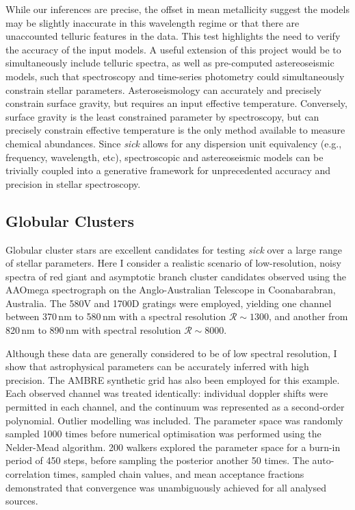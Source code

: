 \documentclass{aastex}
\newcommand{\sick}{\textit{sick}}
\begin{document}
While our inferences are precise, the offset in mean metallicity suggest the 
models may be slightly inaccurate in this wavelength regime or that there are 
unaccounted telluric features in the data. This test highlights the need to 
verify the accuracy of the input models. A useful extension of this project 
would be to simultaneously include telluric spectra, as well as pre-computed 
astereoseismic models, such that spectroscopy and time-series photometry could 
simultaneously constrain stellar parameters. Asteroseismology can accurately and 
precisely constrain surface gravity, but requires an input effective temperature. 
Conversely, surface gravity is the least constrained parameter by spectroscopy, 
but can precisely constrain effective temperature is the only method available 
to measure chemical abundances. Since \sick{} allows for any dispersion unit 
equivalency (e.g., frequency, wavelength, etc), spectroscopic and astereoseismic 
models can be trivially coupled into a generative framework for unprecedented 
accuracy and precision in stellar spectroscopy.

\subsection{Globular Clusters}
Globular cluster stars are excellent candidates for testing \sick{} over a large 
range of stellar parameters. Here I consider a realistic scenario of 
low-resolution, noisy spectra of red giant and asymptotic branch cluster 
candidates observed using the AAOmega spectrograph on the Anglo-Australian 
Telescope in Coonabarabran, Australia. The 580V and 1700D gratings were employed, 
yielding one channel between 370\,nm to 580\,nm with a spectral resolution 
$\mathcal{R} \sim 1300$, and another from 820\,nm to 890\,nm with spectral 
resolution $\mathcal{R} \sim 8000$.

Although these data are generally considered to be of low spectral resolution, 
I show that astrophysical parameters can be accurately inferred with high 
precision. The AMBRE synthetic grid has also been employed for this example. 
Each observed channel was treated identically: individual doppler shifts were 
permitted in each channel, and the continuum was represented as a second-order 
polynomial. Outlier modelling was included.
The parameter space was randomly sampled 1000 times before numerical optimisation 
was performed using the Nelder-Mead algorithm. 200 walkers explored the parameter 
space for a burn-in period of 450 steps, before sampling the posterior another 
50 times. The auto-correlation times, sampled chain values, and mean acceptance 
fractions demonstrated that convergence was unambiguously achieved for all 
analysed sources.
\end{document}

